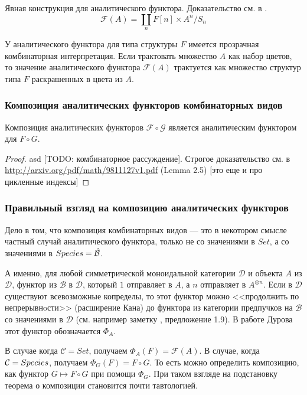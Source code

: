 Явная конструкция для аналитического функтора. Доказательство см. в
\cite{BergTrees}.
\begin{equation}
\label{eq:an}
	\mathcal F(A) = \coprod\limits_n F[n] \times A^n / S_n
\end{equation}

\begin{remark}
\label{rem:color}
У аналитического функтора для типа структуры $F$ имеется прозрачная
комбинаторная интерпретация.
Если трактовать множество $A$ как набор цветов,
то значение аналитического функтора $\mathcal F(A)$ трактуется как множество структур типа $F$
раскрашенных в цвета из $A$.
\end{remark}

\subsubsection{Композиция аналитических функторов комбинаторных видов}
\begin{theorem}
Композиция аналитических функторов $\mathcal F \circ \mathcal G$ является
аналитическим функтором для $F \circ G$.
\end{theorem}
\begin{proof}
asd
[TODO: комбинаторное рассуждение].
Строгое доказательство см. в \url{http://arxiv.org/pdf/math/9811127v1.pdf}
(Lemma 2.5) [это еще и про цикленные индексы]
\end{proof}

\subsubsection{Правильный взгляд на композицию аналитических функторов}
\label{sec:durov}
Дело в том, что композиция комбинаторных видов --- это в некотором смысле
частный случай аналитического функтора, только не со значениями в $Set$,
а со значениями в $Species = \Hat {\mathcal B}$.

А именно, для любой симметрической моноидальной категории $\mathcal D$ и
объекта $A$ из $\mathcal D$, функтор из $\mathcal B$ в $\mathcal D$, который $1$
отправляет в $A$, а $n$ отправляет в $A^{\otimes n}$. Если в $\mathcal D$
существуют всевозможные копределы, то этот функтор можно <<продолжить по
непрерывнoсти>> (расширение Кана) до функтора из категории предпучков на
$\mathcal B$ со значениями в $\mathcal D$ (см. например заметку
\cite{doldkan}, предложение 1.9).
В работе Дурова \cite{Durov} этот функтор обозначается $\Phi_A$.

В случае когда $\mathcal C = Set$, получаем
$\Phi_A(F)=\mathcal F(A)$. В случае, когда $\mathcal C = Species$, получаем
$\Phi_G(F)=F \circ G$. То есть можно определить композицию, как функтор
$G \mapsto F\circ G$ при помощи $\Phi_G$. 
При таком взгляде на подстановку теорема о композиции становится почти тавтологией.


